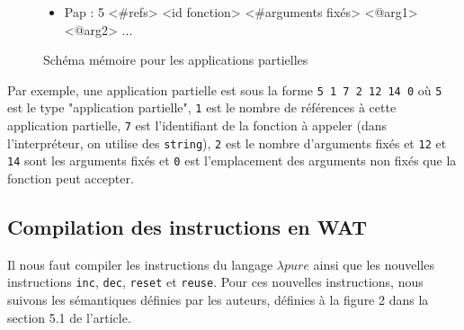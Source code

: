\documentclass{rapportECL}
\begin{document}
\begin{figure}[H]
	\begin{itemize}
		\item Pap   : 5 <\#refs> <id fonction> <\#arguments fixés> <@arg1> <@arg2> ...
	\end{itemize}
	\caption{Schéma mémoire pour les applications partielles}
	\label{listing:memory_wasm_pap}
\end{figure}

Par exemple, une application partielle est sous la forme \verb|5 1 7 2 12 14 0| où \verb|5| est le type "application partielle", 
\verb|1| est le nombre de références à cette application partielle, 
\verb|7| est l'identifiant de la fonction à appeler (dans l'interpréteur, on utilise des \verb|string|), 
\verb|2| est le nombre d'arguments fixés et \verb|12| et \verb|14| sont les arguments fixés et
\verb|0| est l'emplacement des arguments non fixés que la fonction peut accepter.

\subsection{Compilation des instructions en WAT}

Il nous faut compiler les instructions du langage $\lambda{pure}$ ainsi que les nouvelles instructions \verb|inc|, 
\verb|dec|, \verb|reset| et \verb|reuse|. Pour ces nouvelles instructions, nous suivons les sémantiques définies par les auteurs, 
définies à la figure 2 dans la section 5.1 de l'article\cite{ullrich_counting_2020}.

\end{document}
